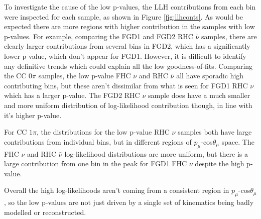 To investigate the cause of the low p-values, the LLH contributions from each bin were inspected for each sample, as shown in Figure \ref{fig:llhconts}. As would be expected there are more regions with higher contribution in the samples with low p-values. For example, comparing the FGD1 and FGD2 RHC $\bar{\nu}$ samples, there are clearly larger contributions from several bins in FGD2, which has a significantly lower p-value, which don't appear for FGD1. However, it is difficult to identify any definitive trends which could explain all the low goodness-of-fits. Comparing the CC 0$\pi$ samples, the low p-value FHC $\nu$ and RHC $\bar{\nu}$ all have sporadic high contributing bins, but these aren't dissimilar from what is seen for FGD1 RHC $\nu$ which has a larger p-value. The FGD2 RHC $\nu$ sample does have a much smaller and more uniform distribution of log-likelihood contribution though, in line with it's higher p-value.

For CC $1\pi$, the distributions for the low p-value RHC $\nu$ samples both have large contributions from individual bins, but in different regions of $p_{\mu}$-cos$\theta_{\mu}$ space. The FHC $\nu$ and RHC $\bar{\nu}$ log-likelihood distributions are more uniform, but there is a large contribution from one bin in the peak for FGD1 FHC $\nu$ despite the high p-value.

Overall the high log-likelihoods aren't coming from a consistent region in $p_{\mu}$-cos$\theta_{\mu}$, so the low p-values are not just driven by a single set of kinematics being badly modelled or reconstructed. 


